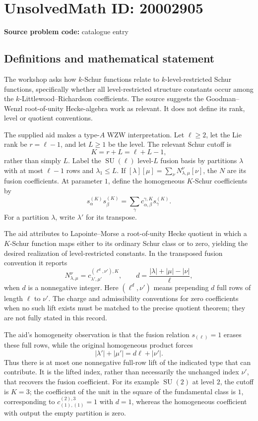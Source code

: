 \documentclass[11pt]{article}
\begin{document}
\section*{UnsolvedMath ID: 20002905}
\textbf{Source problem code:} catalogue entry
\subsection{Definitions and mathematical statement}
The workshop asks how $k$-Schur functions relate to $k$-level-restricted Schur functions, specifically whether all level-restricted structure constants occur among the $k$-Littlewood--Richardson coefficients. The source suggests the Goodman--Wenzl root-of-unity Hecke-algebra work as relevant. It does not define its rank, level or quotient conventions.

The supplied aid makes a type-$A$ WZW interpretation. Let $\ell\geq2$, let the Lie rank be $r=\ell-1$, and let $L\geq1$ be the level. The relevant Schur cutoff is
\[
K=r+L=\ell+L-1,
\]
rather than simply $L$. Label the $\operatorname{SU}(\ell)$ level-$L$ fusion basis by partitions $\lambda$ with at most $\ell-1$ rows and $\lambda_1\leq L$. If $[\lambda][\mu]=\sum_\nu N_{\lambda,\mu}^{\nu}[\nu]$, the $N$ are its fusion coefficients. At parameter $1$, define the homogeneous $K$-Schur coefficients by
\[
s_\alpha^{(K)}s_\beta^{(K)}=\sum_\gamma c_{\alpha,\beta}^{\gamma,K}s_\gamma^{(K)}.
\]
For a partition $\lambda$, write $\lambda'$ for its transpose.

The aid attributes to Lapointe--Morse a root-of-unity Hecke quotient in which a $K$-Schur function maps either to its ordinary Schur class or to zero, yielding the desired realization of level-restricted constants. In the transposed fusion convention it reports
\[
N_{\lambda,\mu}^{\nu}=c_{\lambda',\mu'}^{(\ell^d,\nu'),K},\qquad
d=\frac{|\lambda|+|\mu|-|\nu|}{\ell},
\]
when $d$ is a nonnegative integer. Here $(\ell^d,\nu')$ means prepending $d$ full rows of length $\ell$ to $\nu'$. The charge and admissibility conventions for zero coefficients when no such lift exists must be matched to the precise quotient theorem; they are not fully stated in this record.

The aid's homogeneity observation is that the fusion relation $s_{(\ell)}=1$ erases these full rows, while the original homogeneous product forces
\[
|\lambda'|+|\mu'|=d\ell+|\nu'|.
\]
Thus there is at most one nonnegative full-row lift of the indicated type that can contribute. It is the lifted index, rather than necessarily the unchanged index $\nu'$, that recovers the fusion coefficient. For its example $\operatorname{SU}(2)$ at level $2$, the cutoff is $K=3$; the coefficient of the unit in the square of the fundamental class is $1$, corresponding to $c_{(1),(1)}^{(2),3}=1$ with $d=1$, whereas the homogeneous coefficient with output the empty partition is zero.
\end{document}
